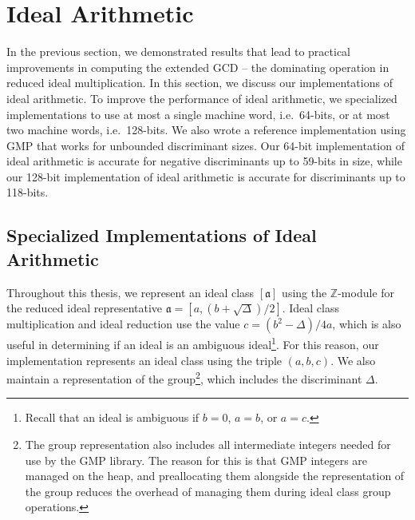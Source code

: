 \documentclass{ucalgthes1}
\theoremstyle{definition}
\newcommand{\ZZ}{\mathbb{Z}}
\begin{document}
\bigbreak
\section{Ideal Arithmetic}
\label{sec:idealArithmetic}

In the previous section, we demonstrated results that lead to practical improvements in computing the extended GCD -- the dominating operation in reduced ideal multiplication.  In this section, we discuss our implementations of ideal arithmetic.  To improve the performance of ideal arithmetic, we specialized implementations to use at most a single machine word, i.e.\ 64-bits, or at most two machine words, i.e.\ 128-bits.  We also wrote a reference implementation using GMP that works for unbounded discriminant sizes.  Our 64-bit implementation of ideal arithmetic is accurate for negative discriminants up to 59-bits  in size, while our 128-bit implementation of ideal arithmetic is accurate for discriminants up to 118-bits.

\subsection{Specialized Implementations of Ideal Arithmetic}

Throughout this thesis, we represent an ideal class $[\mathfrak a]$ using the $\ZZ$-module for the reduced ideal representative $\mathfrak a = [a, (b + \sqrt{\Delta})/2]$.  Ideal class multiplication and ideal reduction use the value $c = (b^2 - \Delta)/4a$, which is also useful in determining if an ideal is an ambiguous ideal\footnote{Recall that an ideal is ambiguous if $b=0$, $a=b$, or $a=c$.}.  For this reason, our implementation represents an ideal class using the triple $(a, b, c)$.  We also maintain a representation of the group\footnote{The group representation also includes all intermediate integers needed for use by the GMP library.  The reason for this is that GMP integers are managed on the heap, and preallocating them alongside the representation of the group reduces the overhead of managing them during ideal class group operations.}, which includes the discriminant $\Delta$.
\end{document}
